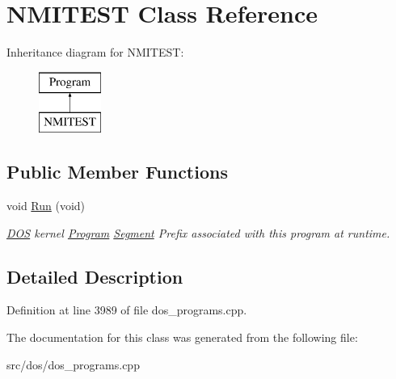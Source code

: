 \hypertarget{classNMITEST}{\section{N\-M\-I\-T\-E\-S\-T Class Reference}
\label{classNMITEST}
}
Inheritance diagram for N\-M\-I\-T\-E\-S\-T\-:\begin{figure}[H]
\begin{center}
\leavevmode
\includegraphics[height=2.000000cm]{classNMITEST}
\end{center}
\end{figure}
\subsection*{Public Member Functions}
\begin{DoxyCompactItemize}
\item 
\hypertarget{classNMITEST_a5ce5aded9d44d5eacd3c640455207076}{void \hyperlink{classNMITEST_a5ce5aded9d44d5eacd3c640455207076}{Run} (void)}\label{classNMITEST_a5ce5aded9d44d5eacd3c640455207076}

\begin{DoxyCompactList}\small\item\em \hyperlink{classDOS}{D\-O\-S} kernel \hyperlink{classProgram}{Program} \hyperlink{structSegment}{Segment} Prefix associated with this program at runtime. \end{DoxyCompactList}\end{DoxyCompactItemize}


\subsection{Detailed Description}


Definition at line 3989 of file dos\-\_\-programs.\-cpp.



The documentation for this class was generated from the following file\-:\begin{DoxyCompactItemize}
\item 
src/dos/dos\-\_\-programs.\-cpp\end{DoxyCompactItemize}

